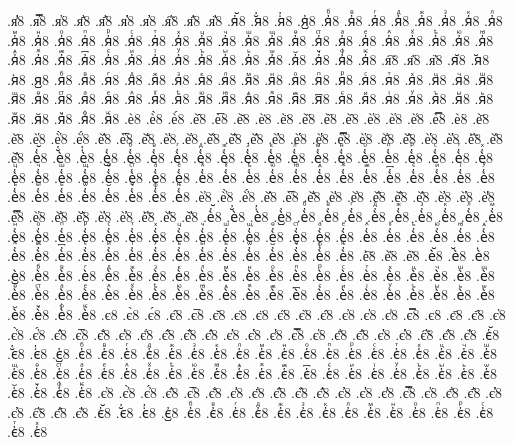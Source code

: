 {.я҆̾8
.я҆̿8
.я҆͘8
.я҆҃8
.я҆҄8
.я҆҅8
.я҆҆8
.я҆҇8
.я҆᷀8
.я҆᷁8
.я҆᷶8
.я᷷҆8
.я᷸҆8
.я᷹҆8
.я҆ⷠ8
.я҆ⷡ8
.я҆ⷢ8
.я҆ⷣ8
.я҆ⷤ8
.я҆ⷥ8
.я҆ⷦ8
.я҆ⷧ8
.я҆ⷨ8
.я҆ⷩ8
.я҆ⷪ8
.я҆ⷫ8
.я҆ⷬ8
.я҆ⷭ8
.я҆ⷮ8
.я҆ⷯ8
.я҆ⷰ8
.я҆ⷱ8
.я҆ⷲ8
.я҆ⷳ8
.я҆ⷴ8
.я҆ⷵ8
.я҆ⷶ8
.я҆ⷷ8
.я҆ⷸ8
.я҆ⷹ8
.я҆ⷺ8
.я҆ⷻ8
.я҆ⷼ8
.я҆ⷽ8
.я҆ⷾ8
.я҆ⷿ8
.я҆꙯8
.я҆ꙴ8
.я҆ꙵ8
.я҆ꙶ8
.я҆ꙷ8
.я҆ꙸ8
.я҆ꙹ8
.я҆ꙺ8
.я҆ꙻ8
.я҆꙼8
.я҆꙽8
.я҆ꚞ8
.я҆ꚟ8
.я҇8
.я᷀8
.я᷁8
.я᷶8
.я᷷8
.я᷸8
.я᷹8
.яⷠ8
.яⷡ8
.яⷢ8
.яⷣ8
.яⷤ8
.яⷥ8
.яⷦ8
.яⷧ8
.яⷨ8
.яⷩ8
.яⷪ8
.яⷫ8
.яⷬ8
.яⷭ8
.яⷮ8
.яⷯ8
.яⷰ8
.яⷱ8
.яⷲ8
.яⷳ8
.яⷴ8
.яⷵ8
.яⷶ8
.яⷷ8
.яⷸ8
.яⷹ8
.яⷺ8
.яⷻ8
.яⷼ8
.яⷽ8
.яⷾ8
.яⷿ8
.я꙯8
.яꙴ8
.яꙵ8
.яꙶ8
.яꙷ8
.яꙸ8
.яꙹ8
.яꙺ8
.яꙻ8
.я꙼8
.я꙽8
.яꚞ8
.яꚟ8
.ѐ8
.ѐ̀8
.ѐ́8
.ѐ̂8
.ѐ̅8
.ѐ̆8
.ѐ̇8
.ѐ̈8
.ѐ̋8
.ѐ̏8
.ѐ̑8
.ѐ̓8
.ѐ̔8
.ѐ̾8
.ѐ̿8
.ѐ͘8
.ѐ҃8
.ѐ҄8
.ѐ҅8
.ѐ҅̀8
.ѐ҅́8
.ѐ҅̂8
.ѐ҅̅8
.ѐ҅̆8
.ѐ҅̇8
.ѐ҅̈8
.ѐ҅̋8
.ѐ҅̏8
.ѐ҅̑8
.ѐ҅̓8
.ѐ҅̔8
.ѐ҅̾8
.ѐ҅̿8
.ѐ҅͘8
.ѐ҅҃8
.ѐ҅҄8
.ѐ҅҅8
.ѐ҅҆8
.ѐ҅҇8
.ѐ҅᷀8
.ѐ҅᷁8
.ѐ҅᷶8
.ѐ᷷҅8
.ѐ᷸҅8
.ѐ᷹҅8
.ѐ҅ⷠ8
.ѐ҅ⷡ8
.ѐ҅ⷢ8
.ѐ҅ⷣ8
.ѐ҅ⷤ8
.ѐ҅ⷥ8
.ѐ҅ⷦ8
.ѐ҅ⷧ8
.ѐ҅ⷨ8
.ѐ҅ⷩ8
.ѐ҅ⷪ8
.ѐ҅ⷫ8
.ѐ҅ⷬ8
.ѐ҅ⷭ8
.ѐ҅ⷮ8
.ѐ҅ⷯ8
.ѐ҅ⷰ8
.ѐ҅ⷱ8
.ѐ҅ⷲ8
.ѐ҅ⷳ8
.ѐ҅ⷴ8
.ѐ҅ⷵ8
.ѐ҅ⷶ8
.ѐ҅ⷷ8
.ѐ҅ⷸ8
.ѐ҅ⷹ8
.ѐ҅ⷺ8
.ѐ҅ⷻ8
.ѐ҅ⷼ8
.ѐ҅ⷽ8
.ѐ҅ⷾ8
.ѐ҅ⷿ8
.ѐ҅꙯8
.ѐ҅ꙴ8
.ѐ҅ꙵ8
.ѐ҅ꙶ8
.ѐ҅ꙷ8
.ѐ҅ꙸ8
.ѐ҅ꙹ8
.ѐ҅ꙺ8
.ѐ҅ꙻ8
.ѐ҅꙼8
.ѐ҅꙽8
.ѐ҅ꚞ8
.ѐ҅ꚟ8
.ѐ҆8
.ѐ҆̀8
.ѐ҆́8
.ѐ҆̂8
.ѐ҆̅8
.ѐ҆̆8
.ѐ҆̇8
.ѐ҆̈8
.ѐ҆̋8
.ѐ҆̏8
.ѐ҆̑8
.ѐ҆̓8
.ѐ҆̔8
.ѐ҆̾8
.ѐ҆̿8
.ѐ҆͘8
.ѐ҆҃8
.ѐ҆҄8
.ѐ҆҅8
.ѐ҆҆8
.ѐ҆҇8
.ѐ҆᷀8
.ѐ҆᷁8
.ѐ҆᷶8
.ѐ᷷҆8
.ѐ᷸҆8
.ѐ᷹҆8
.ѐ҆ⷠ8
.ѐ҆ⷡ8
.ѐ҆ⷢ8
.ѐ҆ⷣ8
.ѐ҆ⷤ8
.ѐ҆ⷥ8
.ѐ҆ⷦ8
.ѐ҆ⷧ8
.ѐ҆ⷨ8
.ѐ҆ⷩ8
.ѐ҆ⷪ8
.ѐ҆ⷫ8
.ѐ҆ⷬ8
.ѐ҆ⷭ8
.ѐ҆ⷮ8
.ѐ҆ⷯ8
.ѐ҆ⷰ8
.ѐ҆ⷱ8
.ѐ҆ⷲ8
.ѐ҆ⷳ8
.ѐ҆ⷴ8
.ѐ҆ⷵ8
.ѐ҆ⷶ8
.ѐ҆ⷷ8
.ѐ҆ⷸ8
.ѐ҆ⷹ8
.ѐ҆ⷺ8
.ѐ҆ⷻ8
.ѐ҆ⷼ8
.ѐ҆ⷽ8
.ѐ҆ⷾ8
.ѐ҆ⷿ8
.ѐ҆꙯8
.ѐ҆ꙴ8
.ѐ҆ꙵ8
.ѐ҆ꙶ8
.ѐ҆ꙷ8
.ѐ҆ꙸ8
.ѐ҆ꙹ8
.ѐ҆ꙺ8
.ѐ҆ꙻ8
.ѐ҆꙼8
.ѐ҆꙽8
.ѐ҆ꚞ8
.ѐ҆ꚟ8
.ѐ҇8
.ѐ᷀8
.ѐ᷁8
.ѐ᷶8
.ѐ᷷8
.ѐ᷸8
.ѐ᷹8
.ѐⷠ8
.ѐⷡ8
.ѐⷢ8
.ѐⷣ8
.ѐⷤ8
.ѐⷥ8
.ѐⷦ8
.ѐⷧ8
.ѐⷨ8
.ѐⷩ8
.ѐⷪ8
.ѐⷫ8
.ѐⷬ8
.ѐⷭ8
.ѐⷮ8
.ѐⷯ8
.ѐⷰ8
.ѐⷱ8
.ѐⷲ8
.ѐⷳ8
.ѐⷴ8
.ѐⷵ8
.ѐⷶ8
.ѐⷷ8
.ѐⷸ8
.ѐⷹ8
.ѐⷺ8
.ѐⷻ8
.ѐⷼ8
.ѐⷽ8
.ѐⷾ8
.ѐⷿ8
.ѐ꙯8
.ѐꙴ8
.ѐꙵ8
.ѐꙶ8
.ѐꙷ8
.ѐꙸ8
.ѐꙹ8
.ѐꙺ8
.ѐꙻ8
.ѐ꙼8
.ѐ꙽8
.ѐꚞ8
.ѐꚟ8
.є8
.є̀8
.є́8
.є̂8
.є̅8
.є̆8
.є̇8
.є̈8
.є̋8
.є̏8
.є̑8
.є̓8
.є̔8
.є̾8
.є̿8
.є͘8
.є҃8
.є҄8
.є҅8
.є҅̀8
.є҅́8
.є҅̂8
.є҅̅8
.є҅̆8
.є҅̇8
.є҅̈8
.є҅̋8
.є҅̏8
.є҅̑8
.є҅̓8
.є҅̔8
.є҅̾8
.є҅̿8
.є҅͘8
.є҅҃8
.є҅҄8
.є҅҅8
.є҅҆8
.є҅҇8
.є҅᷀8
.є҅᷁8
.є҅᷶8
.є᷷҅8
.є᷸҅8
.є᷹҅8
.є҅ⷠ8
.є҅ⷡ8
.є҅ⷢ8
.є҅ⷣ8
.є҅ⷤ8
.є҅ⷥ8
.є҅ⷦ8
.є҅ⷧ8
.є҅ⷨ8
.є҅ⷩ8
.є҅ⷪ8
.є҅ⷫ8
.є҅ⷬ8
.є҅ⷭ8
.є҅ⷮ8
.є҅ⷯ8
.є҅ⷰ8
.є҅ⷱ8
.є҅ⷲ8
.є҅ⷳ8
.є҅ⷴ8
.є҅ⷵ8
.є҅ⷶ8
.є҅ⷷ8
.є҅ⷸ8
.є҅ⷹ8
.є҅ⷺ8
.є҅ⷻ8
.є҅ⷼ8
.є҅ⷽ8
.є҅ⷾ8
.є҅ⷿ8
.є҅꙯8
.є҅ꙴ8
.є҅ꙵ8
.є҅ꙶ8
.є҅ꙷ8
.є҅ꙸ8
.є҅ꙹ8
.є҅ꙺ8
.є҅ꙻ8
.є҅꙼8
.є҅꙽8
.є҅ꚞ8
.є҅ꚟ8
.є҆8
.є҆̀8
.є҆́8
.є҆̂8
.є҆̅8
.є҆̆8
.є҆̇8
.є҆̈8
.є҆̋8
.є҆̏8
.є҆̑8
.є҆̓8
.є҆̔8
.є҆̾8
.є҆̿8
.є҆͘8
.є҆҃8
.є҆҄8
.є҆҅8
.є҆҆8
.є҆҇8
.є҆᷀8
.є҆᷁8
.є҆᷶8
.є᷷҆8
.є᷸҆8
.є᷹҆8
.є҆ⷠ8
.є҆ⷡ8
.є҆ⷢ8
.є҆ⷣ8
.є҆ⷤ8
.є҆ⷥ8
.є҆ⷦ8
.є҆ⷧ8
.є҆ⷨ8
.є҆ⷩ8
.є҆ⷪ8
.є҆ⷫ8
.є҆ⷬ8
.є҆ⷭ8
.є҆ⷮ8
.є҆ⷯ8
}
